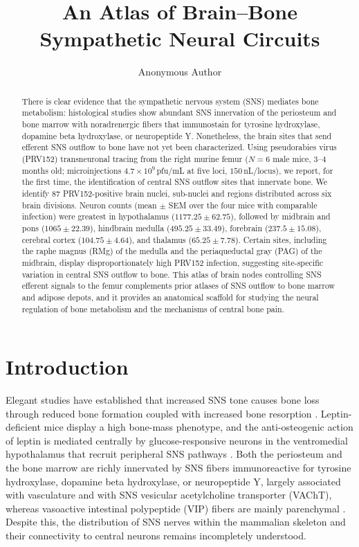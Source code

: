 \documentclass[11pt]{article}
\title{An Atlas of Brain--Bone Sympathetic Neural Circuits}
\author[1]{Anonymous Author}
\affil[1]{Anonymous Institution}
\date{}
\begin{document}
\maketitle

\begin{abstract}
There is clear evidence that the sympathetic nervous system (SNS) mediates bone metabolism: histological studies show abundant SNS innervation of the periosteum and bone marrow with noradrenergic fibers that immunostain for tyrosine hydroxylase, dopamine beta hydroxylase, or neuropeptide Y. Nonetheless, the brain sites that send efferent SNS outflow to bone have not yet been characterized. Using pseudorabies virus (PRV152) transneuronal tracing from the right murine femur ($N=6$ male mice, 3--4 months old; microinjections $4.7 \times 10^9$\,pfu/mL at five loci, $150$\,nL/locus), we report, for the first time, the identification of central SNS outflow sites that innervate bone. We identify $87$ PRV152-positive brain nuclei, sub-nuclei and regions distributed across six brain divisions. Neuron counts (mean $\pm$ SEM over the four mice with comparable infection) were greatest in hypothalamus ($1177.25 \pm 62.75$), followed by midbrain and pons ($1065 \pm 22.39$), hindbrain medulla ($495.25 \pm 33.49$), forebrain ($237.5 \pm 15.08$), cerebral cortex ($104.75 \pm 4.64$), and thalamus ($65.25 \pm 7.78$). Certain sites, including the raphe magnus (RMg) of the medulla and the periaqueductal gray (PAG) of the midbrain, display disproportionately high PRV152 infection, suggesting site-specific variation in central SNS outflow to bone. This atlas of brain nodes controlling SNS efferent signals to the femur complements prior atlases of SNS outflow to bone marrow and adipose depots, and it provides an anatomical scaffold for studying the neural regulation of bone metabolism and the mechanisms of central bone pain.
\end{abstract}

\section{Introduction}

Elegant studies have established that increased SNS tone causes bone loss through reduced bone formation coupled with increased bone resorption \cite{elefteriou2018,elefteriou2005,takeda2002}. Leptin-deficient mice display a high bone-mass phenotype, and the anti-osteogenic action of leptin is mediated centrally by glucose-responsive neurons in the ventromedial hypothalamus that recruit peripheral SNS pathways \cite{ducy2000,takeda2002}. Both the periosteum and the bone marrow are richly innervated by SNS fibers immunoreactive for tyrosine hydroxylase, dopamine beta hydroxylase, or neuropeptide Y, largely associated with vasculature and with SNS vesicular acetylcholine transporter (VAChT), whereas vasoactive intestinal polypeptide (VIP) fibers are mainly parenchymal \cite{francis1997,hill1991,hohmann1986,martin2007}. Despite this, the distribution of SNS nerves within the mammalian skeleton and their connectivity to central neurons remains incompletely understood.
\end{document}

